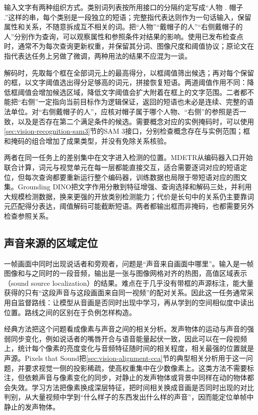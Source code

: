 输入文字有两种组织方式。类别词列表按所用接口的分隔约定写成“人物 . 帽子 .”这样的串，每个类别是一段独立的短语；完整指代表达则作为一句话输入，保留属性和关系，不随意拆成互不相关的词。把“人物”“戴帽子的人”“右侧戴帽子的人”分别作为查询，可以观察属性和参照条件对结果的影响。使用已发布检查点时，通常不为每次查询更新权重，并保留其分词、图像尺度和阈值协议；原论文在指代表达任务上另做了微调，两种用法的结果不应混为一谈。

解码时，先取每个框在全部词元上的最高得分，以框阈值筛出候选；再对每个保留的框，以文字阈值选出得分足够高的词元，拼接恢复短语。两道阈值作用不同：降低框阈值会增加候选区域，降低文字阈值会扩大附着在框上的文字范围。二者都不能把“右侧”一定指向当前目标作为逻辑保证，返回的短语也未必是连续、完整的语法单位。对“右侧戴帽子的人”，应核对帽子属于哪个人物、“右侧”的参照是否一致，以及是否存在第二个满足条件的候选。需要概念对应的实例掩码时，可以使用\ref{sec:vision-recognition-sam3}节的SAM 3接口，分别检查概念存在与实例范围；框和掩码的组合增加了成果类型，并没有免除关系核验。

两者在同一任务上的差别集中在文字进入检测的位置。MDETR从编码器入口开始联合计算，词元与视觉单元在每一层都能直接交互，适合需要逐词对应的短语定位，但每次查询都要重新运行整个编码器，训练数据也局限于带短语对应的图文集。Grounding DINO把文字作用分散到特征增强、查询选择和解码三处，并利用大规模检测数据，换来更强的开放类别检测能力；代价是长句中的关系仍主要靠词元匹配得分表达，阈值解码可能截断短语。两者都输出框而非掩码，也都需要另外检查参照关系。

\subsection{声音来源的区域定位}
\label{sec:vision-understanding-sound-source}

一帧画面中同时出现说话者和旁观者，问题是“声音来自画面中哪里”。输入是一帧图像和与之同时的一段音频，输出是一张与图像网格对齐的热图，高值区域表示（sound source localization）的结果。难点在于几乎没有带框的声源标注，能大量获得的只有“这段声音与这段画面来自同一视频”的配对关系。因此这一任务通常采用自监督路线：让模型从音画是否同时出现中学习，再从学到的空间相似度中读出位置。路线之间的区别在于负例怎样构造。

经典方法把这个问题看成像素与声音之间的相关分析。发声物体的运动与声音的强弱同步变化，例如说话者的嘴唇开合与语音能量起伏一致，因此可以在一段视频上，统计每个像素的亮度变化与音频特征随时间的相关程度，相关最强的位置就是声源。Pixels that Sound把\ref{sec:vision-alignment-cca}节的典型相关分析用于这一问题，并要求视觉一侧的投影稀疏，使高权重集中在少数像素上。这类方法不需要标注，但依赖声音与像素变化的同步，对静止的发声物体或背景中同样在动的物体都会失效。学习方法把像素换成深层特征，把时间相关换成音画是否同时出现的对比判别，从大量视频中学到“什么样子的东西发出什么样的声音”，因而能定位单帧中静止的发声物体。

